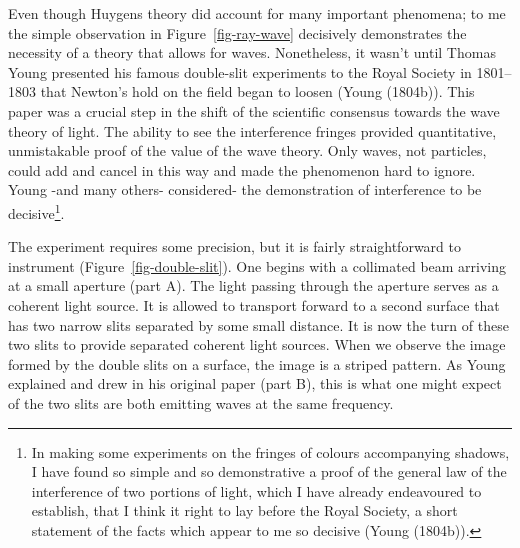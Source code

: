 \documentclass[
  letterpaper,
]{book}
\begin{document}
Even though Huygens theory did account for many important phenomena; to
me the simple observation in Figure~\ref{fig-ray-wave} decisively
demonstrates the necessity of a theory that allows for waves.
Nonetheless, it wasn't until Thomas Young presented his famous
double-slit experiments to the Royal Society in 1801--1803 that Newton's
hold on the field began to loosen (Young (1804b)). This paper was a
crucial step in the shift of the scientific consensus towards the wave
theory of light. The ability to see the interference fringes provided
quantitative, unmistakable proof of the value of the wave theory. Only
waves, not particles, could add and cancel in this way and made the
phenomenon hard to ignore. Young -and many others- considered- the
demonstration of interference to be decisive\footnote{In making some
  experiments on the fringes of colours accompanying shadows, I have
  found so simple and so demonstrative a proof of the general law of the
  interference of two portions of light, which I have already
  endeavoured to establish, that I think it right to lay before the
  Royal Society, a short statement of the facts which appear to me so
  decisive (Young (1804b)).}.

The experiment requires some precision, but it is fairly straightforward
to instrument (Figure~\ref{fig-double-slit}). One begins with a
collimated beam arriving at a small aperture (part A). The light passing
through the aperture serves as a coherent light source. It is allowed to
transport forward to a second surface that has two narrow slits
separated by some small distance. It is now the turn of these two slits
to provide separated coherent light sources. When we observe the image
formed by the double slits on a surface, the image is a striped pattern.
As Young explained and drew in his original paper (part B), this is what
one might expect of the two slits are both emitting waves at the same
frequency.
\end{document}
